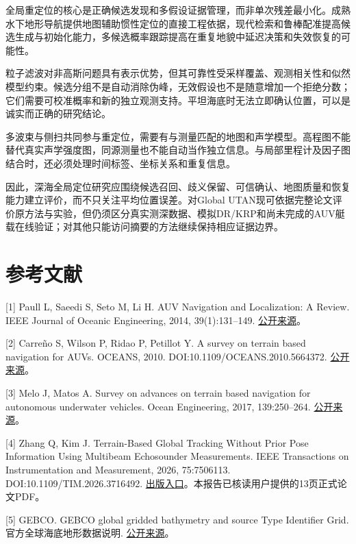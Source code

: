 全局重定位的核心是正确候选发现和多假设证据管理，而非单次残差最小化。成熟水下地形导航提供地图辅助惯性定位的直接工程依据，现代检索和鲁棒配准提高候选生成与初始化能力，多候选概率跟踪提高在重复地貌中延迟决策和失效恢复的可能性。

粒子滤波对非高斯问题具有表示优势，但其可靠性受采样覆盖、观测相关性和似然模型约束。候选分组不是自动消除伪峰，无效假设也不是随意增加一个拒绝分数；它们需要可校准概率和新的独立观测支持。平坦海底时无法立即确认位置，可以是诚实而正确的研究结论。

多波束与侧扫共同参与重定位，需要有与测量匹配的地图和声学模型。高程图不能替代真实声学强度图，同源测量也不能自动当作独立信息。与局部里程计及因子图结合时，还必须处理时间标签、坐标关系和重复信息。

因此，深海全局定位研究应围绕候选召回、歧义保留、可信确认、地图质量和恢复能力建立评价，而不只关注平均位置误差。对Global UTAN现可依据完整论文评价原方法与实验，但仍须区分真实测深数据、模拟DR/KRP和尚未完成的AUV艇载在线验证；对其他只能访问摘要的方法继续保持相应证据边界。

\hypertarget{ux53c2ux8003ux6587ux732e}{%
\section{参考文献}\label{ux53c2ux8003ux6587ux732e}}

{[}1{]} Paull L, Saeedi S, Seto M, Li H. AUV Navigation and Localization: A Review. IEEE Journal of Oceanic Engineering, 2014, 39(1):131--149. \href{https://people.csail.mit.edu/lpaull/publications/Paull_JOE_2014.pdf}{公开来源}。

{[}2{]} Carreño S, Wilson P, Ridao P, Petillot Y. A survey on terrain based navigation for AUVs. OCEANS, 2010. DOI:10.1109/OCEANS.2010.5664372. \href{https://eprints.soton.ac.uk/153897/1/Carreno_2010_-_A_survey__on_TBN_for_AUVs.pdf}{公开来源}。

{[}3{]} Melo J, Matos A. Survey on advances on terrain based navigation for autonomous underwater vehicles. Ocean Engineering, 2017, 139:250--264. \href{https://doi.org/10.1016/j.oceaneng.2017.04.047}{公开来源}。

{[}4{]} Zhang Q, Kim J. Terrain-Based Global Tracking Without Prior Pose Information Using Multibeam Echosounder Measurements. IEEE Transactions on Instrumentation and Measurement, 2026, 75:7506113. DOI:10.1109/TIM.2026.3716492. \href{https://doi.org/10.1109/TIM.2026.3716492}{出版入口}。本报告已核读用户提供的13页正式论文PDF。

{[}5{]} GEBCO. GEBCO global gridded bathymetry and source Type Identifier Grid. 官方全球海底地形数据说明. \href{https://www.gebco.net/data_and_products/gridded_bathymetry_data/}{公开来源}。

